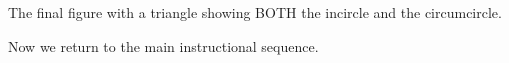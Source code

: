 \documentclass{tufte-handout}
\newcommand{\uvx}{\vspace{.2in}}
\newcommand{\uvxx}{\vspace{.3in}}
\begin{document}
\begin{tcolorbox}
\uvx
\begin{minipage}{0.5\textwidth}
\end{minipage} \hfill
\begin{minipage}{0.45\textwidth}
\begin{scriptsize}
The final figure with a triangle showing BOTH the incircle and the circumcircle. 




\end{scriptsize}
\end{minipage}

\uvxx

Now we return to the main instructional sequence. 
\end{tcolorbox}
\end{document}
